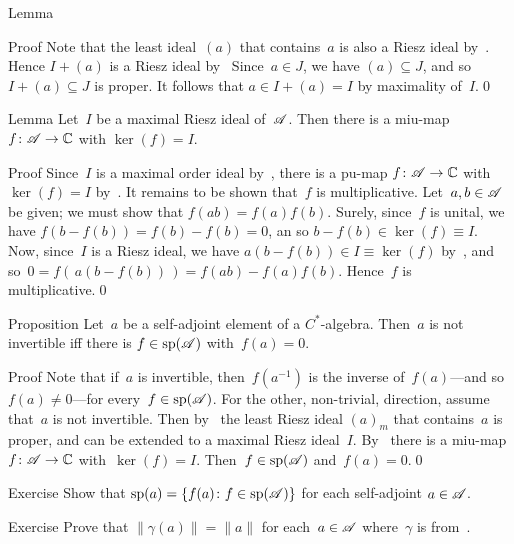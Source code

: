\documentclass[a]{subfiles}
\begin{document}
\begin{parsec}
\begin{point}{Lemma}
\begin{point}{Proof}
Note that the least ideal~$(a)$ that contains~$a$
is also a Riesz ideal by~.
Hence  $I+(a)$ is a Riesz ideal by~
Since~$a\in J$, we have $(a)\subseteq J$,
and so~$I+(a)\subseteq J$ is proper.
It follows that $a\in I+(a)=I$ by maximality of~$I$.\qed
\end{point}
\end{point}
\begin{point}{Lemma}%
Let~$I$ be a maximal Riesz ideal of~$\mathscr{A}$.
Then there is a miu-map $f\colon \mathscr{A}\to \mathbb{C}$
with $\ker(f)=I$.
\begin{point}{Proof}%
Since~$I$ is a maximal order ideal 
by~,
there is a pu-map $f\colon \mathscr{A}\to \mathbb{C}$
with~$\ker(f)=I$ by~.
It remains to be shown that~$f$ is multiplicative.
Let~$a,b\in \mathscr{A}$ be given;
we must show that $f(ab)=f(a)f(b)$.
Surely, since~$f$ is unital,
we have $f(b-f(b))=f(b)-f(b)=0$,
an so $b-f(b)\in \ker(f)\equiv I$.
Now, since~$I$ is a Riesz ideal,
we have $a(b-f(b))\in I\equiv \ker(f)$ by~,
and so~$0=f(\,a(b-f(b))\,)=f(ab)-f(a)f(b)$.
Hence~$f$ is multiplicative.\qed
\end{point}
\end{point}
\begin{point}{Proposition}%
Let~$a$ be a self-adjoint element of a $C^*$-algebra.
Then~$a$ is not invertible
iff there is $f\in\mathrm{sp}(\mathscr{A})$ 
with~$f(a)=0$.
\begin{point}{Proof}%
Note that if~$a$ is invertible,
then~$f(a^{-1})$ is the inverse of~$f(a)$---and so~$f(a)\neq 0$---for 
every~$f\in\mathrm{sp}(\mathscr{A})$.
For the other, non-trivial, direction,
assume that~$a$ is not invertible.
Then 
by~
the least Riesz ideal $(a)_m$
that contains~$a$ is proper,
and can be extended to a maximal Riesz ideal~$I$.
By~
there is a miu-map $f\colon \mathscr{A}\to\mathbb{C}$
with~$\ker(f)=I$.
Then~$f\in\mathrm{sp}(\mathscr{A})$
and~$f(a)=0$.\qed
\end{point}
\end{point}
\begin{point}{Exercise}%
Show that $\mathrm{sp}(a)=\{f(a)\colon f\in\mathrm{sp}(\mathscr{A})\}$
for each self-adjoint $a\in\mathscr{A}$.
\end{point}
\begin{point}{Exercise}%
Prove that $\|\gamma(a)\|=\|a\|$
for each~$a\in\mathscr{A}$
where~$\gamma$ is from~.


\end{point}
\end{parsec}
\end{document}
